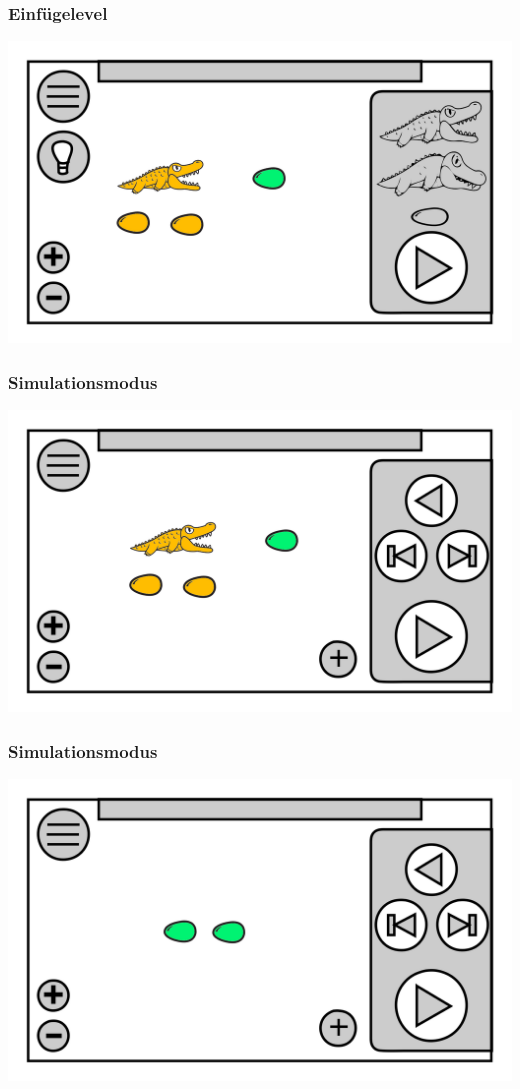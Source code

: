 \documentclass[t]{beamer}
\begin{document}
\begin{frame}
	\frametitle{Einfügelevel}
	\includegraphics[height=\textheight]{level_colored_croc2.png}
\end{frame}
\begin{frame}
	\frametitle{Simulationsmodus}
	\includegraphics[height=\textheight]{level_simulation_croc.png}
\end{frame}
\begin{frame}
	\frametitle{Simulationsmodus}
	\includegraphics[height=\textheight]{level_simulation_solved.png}
\end{frame}
\end{document}
